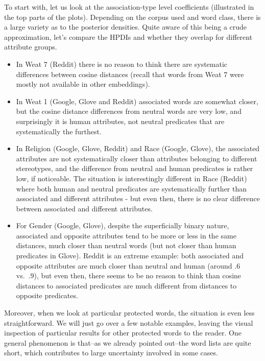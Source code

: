 \documentclass[
  12pt,
  dvipsnames,enabledeprecatedfontcommands]{scrartcl}
\begin{document}
To start with, let us look at the association-type level coefficients
(illustrated in the top parts of the plots). Depending on the corpus
used and word class, there is a large variety as to the posterior
densities. Quite aware of this being a crude approximation, let's
compare the HPDIs and whether they overlap for different attribute
groups.

\begin{itemize}
\item
  In Weat 7 (Reddit) there is no reason to think there are systematic
  differences between cosine distances (recall that words from Weat 7
  were mostly not available in other embeddings).
\item
  In Weat 1 (Google, Glove and Reddit) associated words are somewhat
  closer, but the cosine distance differences from neutral words are
  very low, and surprisingly it is human attributes, not neutral
  predicates that are systematically the furthest.
\item
  In Religion (Google, Glove, Reddit) and Race (Google, Glove), the
  associated attributes are not systematically closer than attributes
  belonging to different stereotypes, and the difference from neutral
  and human predicates is rather low, if noticeable. The situation is
  interestingly different in Race (Reddit) where both human and neutral
  predicates are systematically further than associated and different
  attributes - but even then, there is no clear difference between
  associated and different attributes.
\item
  For Gender (Google, Glove), despite the superficially binary nature,
  associated and opposite attributes tend to be more or less in the same
  distances, much closer than neutral words (but not closer than human
  predicates in Glove). Reddit is an extreme example: both associated
  and opposite attributes are much closer than neutral and human (around
  .6 vs.~.9), but even then, there seems to be no reason to think than
  cosine distances to associated predicates are much different from
  distances to opposite predicates.
\end{itemize}

Moreover, when we look at particular protected words, the situation is
even less straightforward. We will just go over a few notable examples,
leaving the visual inspection of particular results for other protected
words to the reader. One general phenomenon is that--as we already
pointed out--the word lists are quite short, which contributes to large
uncertainty involved in some cases.
\end{document}
